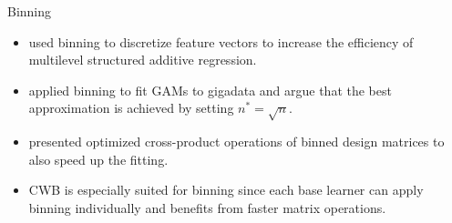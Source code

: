 \documentclass[t,10pt]{beamer}
\begin{document}
\begin{frame}{Binning}
  \begin{itemize}
    \item
      \citet{lang2014multilevel} used binning to discretize feature vectors
      to increase the efficiency of multilevel structured additive
      regression.
    \item
      \citet{wood2017gigadata} applied binning to fit GAMs to gigadata and
      argue that the best approximation is achieved by setting
      \(n^\ast = \sqrt{n}\).
    \item
      \citet{li2020faster} presented optimized cross-product operations of
      binned design matrices to also speed up the fitting.

    \item
        CWB is especially suited for binning since each base learner can apply binning individually and benefits from faster matrix operations.
  \end{itemize}
\end{frame}
\end{document}
